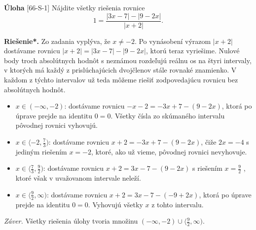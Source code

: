 \documentclass{article}
\newcommand{\rieh}{\textbf{Riešenie*.} }
\newcommand{\problem}[3]{
  \begin{tcolorbox}[breakable,notitle,boxrule=0pt,colback=light-gray,colframe=light-gray]
    \textbf{Úloha}
    [#1] #2
  \end{tcolorbox}
  \noindent#3
}
\begin{document}
\problem{66-S-1}{
Nájdite všetky riešenia rovnice
$$1 =\frac{|3x - 7| - |9 - 2x|}{|x + 2|}.$$
}{
\rieh Zo zadania vyplýva, že $x\neq -2$. Po vynásobení výrazom $|x + 2|$ dostávame
rovnicu $|x + 2| = |3x - 7| - |9 - 2x|$, ktorú teraz vyriešime. Nulové body troch absolútnych hodnôt s neznámou rozdeľujú reálnu os na štyri intervaly, v ktorých má každý z prislúchajúcich dvojčlenov stále rovnaké znamienko. V každom z týchto intervalov už teda môžeme riešiť zodpovedajúcu rovnicu bez absolútnych hodnôt.
\begin{itemize}
    \item $x \in (-\infty, -2)$: dostávame rovnicu $-x - 2 = -3x + 7 - (9 - 2x)$, ktorá po úprave prejde na identitu $0 = 0$. Všetky čísla zo skúmaného intervalu pôvodnej rovnici vyhovujú.
    \item $x \in \langle -2, \frac{7}{3})$: dostávame rovnicu $x+2 = -3x+7-(9-2x)$, čiže $2x = -4$ s jediným riešením $x = -2$, ktoré, ako už vieme, pôvodnej rovnici nevyhovuje.
    \item $x \in \langle \frac{7}{3}, \frac{9}{2})$: dostávame rovnicu $x + 2 = 3x - 7 - (9 - 2x)$ s riešením $x = \frac{9}{2}$ , ktoré však v uvažovanom intervale neleží.
    \item $x \in \langle \frac{9}{2}, \infty)$: dostávame rovnicu $x + 2 = 3x - 7 - (-9 + 2x)$, ktorá po úprave prejde na identitu $0 = 0$. Vyhovujú všetky $x$ z tohto intervalu.
\end{itemize}

\textit{Záver.} Všetky riešenia úlohy tvoria množinu $(-\infty, -2) \cup \langle \frac{9}{2},\infty)$.
}
\end{document}
